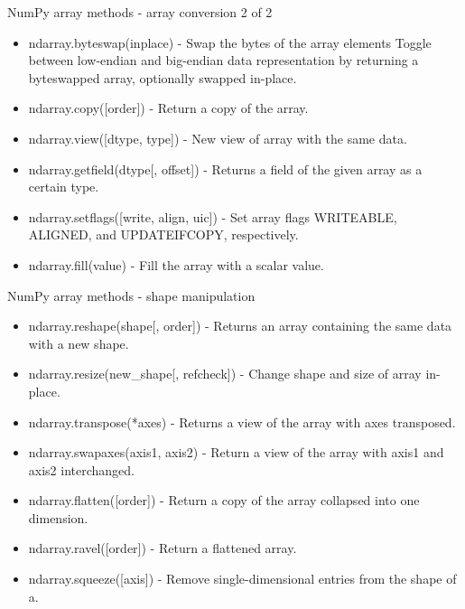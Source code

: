 \documentclass[10pt]{beamer}
\begin{document}
\begin{frame}{NumPy array methods - array conversion 2 of 2}
\begin{itemize}
\item ndarray.byteswap(inplace) -	Swap the bytes of the array elements Toggle between low-endian and big-endian data representation by returning a byteswapped array, optionally swapped in-place.
\item ndarray.copy([order]) -	Return a copy of the array.
\item ndarray.view([dtype, type]) -	New view of array with the same data.
\item ndarray.getfield(dtype[, offset]) -	Returns a field of the given array as a certain type.
\item ndarray.setflags([write, align, uic]) -	Set array flags WRITEABLE, ALIGNED, and UPDATEIFCOPY, respectively.
\item ndarray.fill(value) -	Fill the array with a scalar value.
\end{itemize}
\end{frame}

\begin{frame}{NumPy array methods - shape manipulation}
\begin{itemize}
\item ndarray.reshape(shape[, order]) -	Returns an array containing the same data with a new shape.
\item ndarray.resize(new\_shape[, refcheck]) - 	Change shape and size of array in-place.
\item ndarray.transpose(*axes) -	Returns a view of the array with axes transposed.
\item ndarray.swapaxes(axis1, axis2) -	Return a view of the array with axis1 and axis2 interchanged.
\item ndarray.flatten([order]) -	Return a copy of the array collapsed into one dimension.
\item ndarray.ravel([order]) -	Return a flattened array.
\item ndarray.squeeze([axis]) -	Remove single-dimensional entries from the shape of a.
\end{itemize}
\end{frame}
\end{document}
